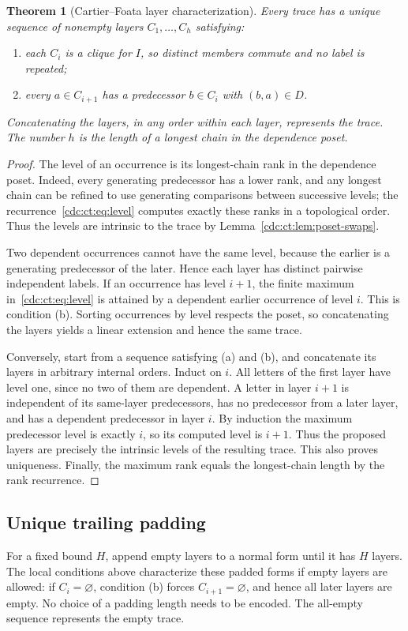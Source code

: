 \documentclass[11pt,a4paper]{article}
\newtheorem{theorem}{Theorem}[section]
\theoremstyle{definition}
\theoremstyle{remark}
\begin{document}
\begin{theorem}[Cartier--Foata layer characterization]\label{cdc:ct:thm:foata}
Every trace has a unique sequence of nonempty layers $C_1,\ldots,C_h$ satisfying:
\begin{enumerate}[label=(\alph*)]
\item each $C_i$ is a clique for $I$, so distinct members commute and no label is repeated;
\item every $a\in C_{i+1}$ has a predecessor $b\in C_i$ with $(b,a)\in D$.
\end{enumerate}
Concatenating the layers, in any order within each layer, represents the trace. The number $h$ is the length of a longest chain in the dependence poset.
\end{theorem}
\begin{proof}
The level of an occurrence is its longest-chain rank in the dependence poset. Indeed, every generating predecessor has a lower rank, and any longest chain can be refined to use generating comparisons between successive levels; the recurrence~\eqref{cdc:ct:eq:level} computes exactly these ranks in a topological order. Thus the levels are intrinsic to the trace by Lemma~\ref{cdc:ct:lem:poset-swaps}.

Two dependent occurrences cannot have the same level, because the earlier is a generating predecessor of the later. Hence each layer has distinct pairwise independent labels. If an occurrence has level $i+1$, the finite maximum in~\eqref{cdc:ct:eq:level} is attained by a dependent earlier occurrence of level $i$. This is condition (b). Sorting occurrences by level respects the poset, so concatenating the layers yields a linear extension and hence the same trace.

Conversely, start from a sequence satisfying (a) and (b), and concatenate its layers in arbitrary internal orders. Induct on $i$. All letters of the first layer have level one, since no two of them are dependent. A letter in layer $i+1$ is independent of its same-layer predecessors, has no predecessor from a later layer, and has a dependent predecessor in layer $i$. By induction the maximum predecessor level is exactly $i$, so its computed level is $i+1$. Thus the proposed layers are precisely the intrinsic levels of the resulting trace. This also proves uniqueness. Finally, the maximum rank equals the longest-chain length by the rank recurrence.
\end{proof}

\subsection{Unique trailing padding}
For a fixed bound $H$, append empty layers to a normal form until it has $H$ layers. The local conditions above characterize these padded forms if empty layers are allowed: if $C_i=\varnothing$, condition (b) forces $C_{i+1}=\varnothing$, and hence all later layers are empty. No choice of a padding length needs to be encoded. The all-empty sequence represents the empty trace.
\end{document}
